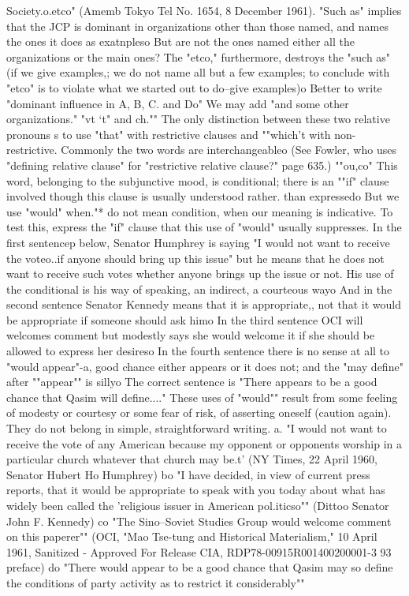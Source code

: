 \documentclass[
    oneside,
    11pt,
    draft
]{memoir}
\begin{document}
Society.o.etco" (Amemb Tokyo Tel No. 1654, 8 December 1961). "Such as" implies that the JCP is dominant in organizations other than those named, and names the ones it does as exatnpleso But are not the ones named either all the organizations or the main ones? The "etco," furthermore, destroys the "such as" (if we give examples,; we do not name all but a few examples; to conclude with "etco" is to violate what we started out to do--give examples)o Better to write "dominant influence in A, B, C. and Do" We may add "and some other organizations." "vt `t" and ch."" The only distinction between these two relative pronouns s to use "that" with restrictive clauses and ""which't with non- restrictive. Commonly the two words are interchangeableo (See Fowler, who uses "defining relative clause" for "restrictive relative clause?" page 635.) ""ou,co" This word, belonging to the subjunctive mood, is conditional; there is an ""if" clause involved though this clause is usually understood rather. than expressedo But we use "would" when."* do not mean condition, when our meaning is indicative. To test this, express the "if" clause that this use of "would" usually suppresses. In the first sentencep below, Senator Humphrey is saying "I would not want to receive the voteo..if anyone should bring up this issue" but he means that he does not want to receive such votes whether anyone brings up the issue or not. His use of the conditional is his way of speaking, an indirect, a courteous wayo And in the second sentence Senator Kennedy means that it is appropriate,, not that it would be appropriate if someone should ask himo In the third sentence OCI will welcomes comment but modestly says she would welcome it if she should be allowed to express her desireso In the fourth sentence there is no sense at all to "would appear"-a, good chance either appears or it does not; and the "may define" after ""appear"" is sillyo The correct sentence is "There appears to be a good chance that Qasim will define...." These uses of "would"" result from some feeling of modesty or courtesy or some fear of risk, of asserting oneself (caution again). They do not belong in simple, straightforward writing. a. "I would not want to receive the vote of any American because my opponent or opponents worship in a particular church whatever that church may be.t' (NY Times, 22 April 1960, Senator Hubert Ho Humphrey) bo "I have decided, in view of current press reports, that it would be appropriate to speak with you today about what has widely been called the 'religious issuer in American pol.iticso"" (Dittoo Senator John F. Kennedy) co "The Sino--Soviet Studies Group would welcome comment on this paperer"" (OCI, "Mao Tse-tung and Historical Materialism," 10 April 1961,
Sanitized - Approved For Release CIA, RDP78-00915R001400200001-3 93 preface) do "There would appear to be a good chance that Qasim may so define the conditions of party activity as to restrict it considerably""
\end{document}
